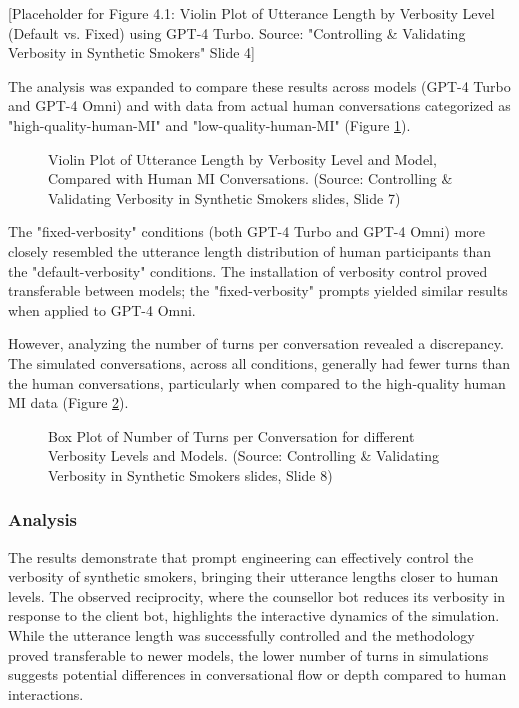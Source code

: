 [Placeholder for Figure 4.1: Violin Plot of Utterance Length by Verbosity Level (Default vs. Fixed) using GPT-4 Turbo. Source: "Controlling \& Validating Verbosity in Synthetic Smokers" Slide 4]

The analysis was expanded to compare these results across models (GPT-4 Turbo and GPT-4 Omni) and with data from actual human conversations categorized as "high-quality-human-MI" and "low-quality-human-MI" (Figure \ref{fig:verbosity_utterance_length}).

\begin{figure}[h]
    \centering
    \caption{Violin Plot of Utterance Length by Verbosity Level and Model, Compared with Human MI Conversations. (Source: Controlling \& Validating Verbosity in Synthetic Smokers slides, Slide 7)}
    \label{fig:verbosity_utterance_length}
\end{figure}

The "fixed-verbosity" conditions (both GPT-4 Turbo and GPT-4 Omni) more closely resembled the utterance length distribution of human participants than the "default-verbosity" conditions. The installation of verbosity control proved transferable between models; the "fixed-verbosity" prompts yielded similar results when applied to GPT-4 Omni.

However, analyzing the number of turns per conversation revealed a discrepancy. The simulated conversations, across all conditions, generally had fewer turns than the human conversations, particularly when compared to the high-quality human MI data (Figure \ref{fig:verbosity_num_turns}).

\begin{figure}[h]
    \centering
    \caption{Box Plot of Number of Turns per Conversation for different Verbosity Levels and Models. (Source: Controlling \& Validating Verbosity in Synthetic Smokers slides, Slide 8)}
    \label{fig:verbosity_num_turns}
\end{figure}

\subsubsection{Analysis}

The results demonstrate that prompt engineering can effectively control the verbosity of synthetic smokers, bringing their utterance lengths closer to human levels. The observed reciprocity, where the counsellor bot reduces its verbosity in response to the client bot, highlights the interactive dynamics of the simulation. While the utterance length was successfully controlled and the methodology proved transferable to newer models, the lower number of turns in simulations suggests potential differences in conversational flow or depth compared to human interactions.

